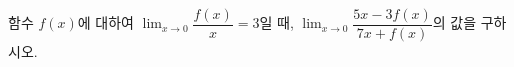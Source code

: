 함수 $f(x)$에 대하여 $\displaystyle\lim_{x\to 0}\dfrac{f(x)}{x}=3$일 때, $\displaystyle\lim_{x\to 0}\dfrac{5x-3f(x)}{7x+f(x)}$의 값을 구하시오.
